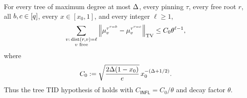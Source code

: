 \begin{proposition}
\label{prop:bbr-tree-tid}
For every tree of maximum degree at most \(\Delta\), every pinning \(\tau\),
every free root \(r\), all \(b,c\in[q]\), every \(x\in[x_0,1]\), and every
integer \(\ell\ge1\),
\begin{equation}
 \sum_{\substack{v:\,\operatorname{dist}(r,v)=\ell\\v\text{ free}}}
 \left\|\mu_v^{\tau^{r=b}}-\mu_v^{\tau^{r=c}}\right\|_{\rm TV}
 \le C_0\theta^{\ell-1},
 \label{eq:bbr-tree-tid}
\end{equation}
where
\begin{equation}
 C_0:=\sqrt{\frac{2\Delta(1-x_0)}e}\,
       x_0^{-(\Delta+1/2)}.
 \label{eq:bbr-C0}
\end{equation}
Thus the tree TID hypothesis of  holds with
\(C_{\mathsf{INFL}}=C_0/\theta\) and decay factor \(\theta\).
\end{proposition}

